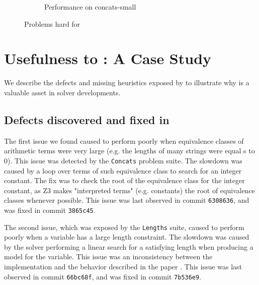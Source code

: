 \begin{figure}[h]
\begin{subfigure}{.5\textwidth}
            \label{fig:concats-small}
            \vspace{-0.25in}
            \caption{Performance on concats-small}
        \end{subfigure}
        \vspace{-0.1in}
        \caption{Problems hard for \us{}}
        \label{fig:z3str3-hard}
        \vspace{-0.3in}
    \end{figure}

    
\section{Usefulness to \us{}: A Case Study}
\vspace{-0.1in}

        We describe the defects and missing heuristics exposed by \fuzzer{} to illustrate why \fuzzer{} is a valuable asset in solver developments.

\vspace{-0.15in}
\subsection{Defects discovered and fixed in \us{}}
\vspace{-0.1in}

The first issue we found caused \us{} to perform poorly when equivalence classes 
of arithmetic terms were very large (e.g. the lengths of many strings were equal s
to 0). This issue was detected by the \texttt{Concats} problem suite. The slowdown 
was caused by a loop over terms of such equivalence class to search for an 
integer constant. The fix was to check the root of the equivalence class for the 
integer constant, as Z3 makes "interpreted terms" (e.g. constants) the root of 
equivalence classes whenever possible. This issue was last observed in commit 
\texttt{6308636}, and was fixed in commit \texttt{3865c45}.


The second issue, which was exposed by the \texttt{Lengths} suite, caused \us{} to 
perform poorly when a variable has a large length constraint. The slowdown was 
caused by the solver performing a linear search for a satisfying length when 
producing a model for the variable. This issue was an inconsistency between the 
implementation and the behavior described in the \us{} paper \cite{z3str3}. 
This issue was last observed in commit \texttt{66bc68f}, and was fixed in commit 
\texttt{7b536e9}.    
    
    
\vspace{-0.15in}    
